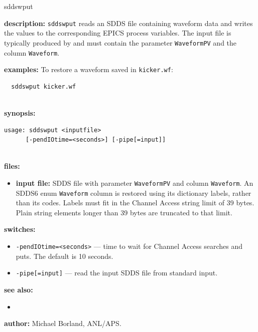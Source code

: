 \begin{sddsprog}{sddswput}
\item \textbf{description:}
  \verb+sddswput+ reads an SDDS file containing waveform data and writes the
  values to the corresponding EPICS process variables.  The input file is
  typically produced by  and must contain the parameter
  \verb|WaveformPV| and the column \verb|Waveform|.

\item \textbf{examples:}
  To restore a waveform saved in \verb|kicker.wf|:
  \begin{verbatim}
  sddswput kicker.wf
  
\end{verbatim}

\item \textbf{synopsis:}
  \begin{verbatim}
usage: sddswput <inputfile>
      [-pendIOtime=<seconds>] [-pipe[=input]]
  
\end{verbatim}

\item \textbf{files:}
\begin{itemize}
  \item \textbf{input file:} SDDS file with parameter \verb|WaveformPV| and column \verb|Waveform|.
    An SDDS6 enum \verb|Waveform| column is restored using its dictionary
    labels, rather than its codes. Labels must fit in the Channel Access
    string limit of 39 bytes. Plain string elements longer than 39 bytes are
    truncated to that limit.
\end{itemize}

\item \textbf{switches:}
\begin{itemize}
  \item {\tt -pendIOtime=<seconds>} --- time to wait for Channel Access searches and puts. The default is 10 seconds.
  \item {\tt -pipe[=input]} --- read the input SDDS file from standard input.
\end{itemize}

\item \textbf{see also:}
\begin{itemize}
  \item {}
\end{itemize}

\item \textbf{author:} Michael Borland, ANL/APS.
\end{sddsprog}
